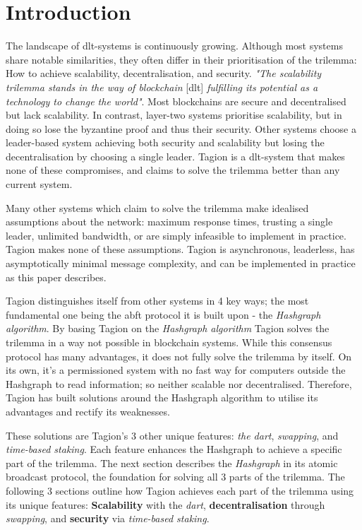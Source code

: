 \section{Introduction}
    The landscape of \gls{dlt}-systems is continuously growing. Although most systems share notable similarities, they often differ in their prioritisation of the \gls{trilemma}: How to achieve scalability, decentralisation, and security. \textit{"The scalability \gls{trilemma} stands in the way of blockchain} [\gls{dlt}] \textit{fulfilling its potential as a technology to change the world"}\cite{BINA}. Most blockchains are secure and decentralised but lack scalability. In contrast, layer-two systems prioritise scalability, but in doing so lose the byzantine proof and thus their security. Other systems choose a leader-based system achieving both security and scalability but losing the decentralisation by choosing a single leader. Tagion is a \gls{dlt}-system that makes none of these compromises, and claims to solve the \gls{trilemma} better than any current system.

    Many other systems which claim to solve the \gls{trilemma} make idealised assumptions about the network: maximum response times, trusting a single leader, unlimited bandwidth, or are simply infeasible to implement in practice. Tagion makes none of these assumptions. Tagion is asynchronous, leaderless, has asymptotically minimal message complexity, and can be implemented in practice as this paper describes. 
    
    Tagion distinguishes itself from other systems in 4 key ways; the most fundamental one being the \gls{abft} protocol it is built upon - the \textit{Hashgraph algorithm}. By basing Tagion on the \textit{Hashgraph algorithm} Tagion solves the \gls{trilemma} in a way not possible in blockchain systems. While this consensus protocol has many advantages, it does not fully solve the \gls{trilemma} by itself. On its own, it's a permissioned system with no fast way for computers outside the Hashgraph to read information; so neither scalable nor decentralised. Therefore, Tagion has built solutions around the Hashgraph algorithm to utilise its advantages and rectify its weaknesses.

    These solutions are Tagion's 3 other unique features: \textit{the \gls{dart}}, \textit{swapping}, and \textit{time-based staking}. Each feature enhances the Hashgraph to achieve a specific part of the \gls{trilemma}. The next section describes the \textit{Hashgraph} in its atomic broadcast protocol, the foundation for solving all 3 parts of the \gls{trilemma}. The following 3 sections outline how Tagion achieves each part of the \gls{trilemma} using its unique features: \textbf{Scalability} with the \textit{\gls{dart}}, \textbf{decentralisation} through \textit{swapping}, and \textbf{security} via \textit{time-based staking}.

